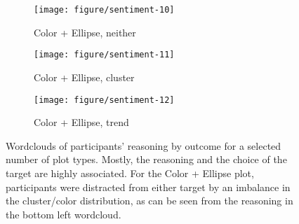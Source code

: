 \documentclass[12pt]{article}\usepackage[]{graphicx}\usepackage[]{color}
\begin{document}
\begin{figure}[ht]
\begin{subfigure}[t]{0.275\linewidth}
  \caption{Color + Ellipse, neither}\vspace{-0.2in}
  \texttt{[image: figure/sentiment-10]}
\end{subfigure}
\begin{subfigure}[t]{0.275\linewidth}
  \caption{Color + Ellipse, cluster}\vspace{-0.2in}
  \texttt{[image: figure/sentiment-11]}
\end{subfigure}
\begin{subfigure}[t]{0.275\linewidth}
  \caption{Color + Ellipse, trend}\vspace{-0.2in}
  \texttt{[image: figure/sentiment-12]}
\end{subfigure}
\caption[Wordclouds of participant responses for selected plot types]{\label{fig:wordles}Wordclouds of participants' reasoning by outcome for a selected number of plot types. Mostly, the reasoning and the choice of the target are highly associated. For the Color + Ellipse plot, participants were distracted from either target by an imbalance in the cluster/color distribution, as can be seen from the reasoning in the bottom left wordcloud.}
\end{figure}
\afterpage{\clearpage}
\end{document}
